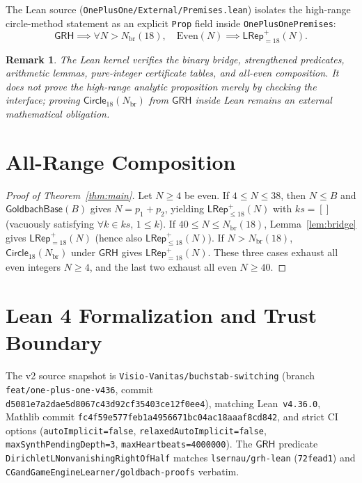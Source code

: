 \documentclass[11pt,a4paper]{article}
\newtheorem{remark}[theorem]{Remark}
\newcommand{\GoldbachBase}{\mathsf{GoldbachBase}}
\newcommand{\Circle}[1]{\mathsf{Circle}_{#1}}
\newcommand{\LRepPos}[1]{\mathsf{LRep}^{+}_{=#1}}
\newcommand{\LRepLe}[1]{\mathsf{LRep}^{+}_{\le #1}}
\newcommand{\GRH}{\mathsf{GRH}}
\begin{document}
The Lean source (\texttt{OnePlusOne/External/Premises.lean}) isolates the high-range circle-method statement as an explicit \texttt{Prop} field inside \texttt{OnePlusOnePremises}:
\[
  \GRH \implies \forall N > N_{\mathrm{br}}(18),\quad \mathrm{Even}(N) \implies \LRepPos{18}(N).
\]

\begin{remark}
The Lean kernel verifies the binary bridge, strengthened predicates, arithmetic lemmas, pure-integer certificate tables, and all-even composition. It does not prove the high-range analytic proposition merely by checking the interface; proving $\Circle{18}(N_{\mathrm{br}})$ from $\GRH$ inside Lean remains an external mathematical obligation.
\end{remark}

\section{All-Range Composition}

\begin{proof}[Proof of Theorem~\ref{thm:main}]
Let $N \ge 4$ be even.
If $4 \le N \le 38$, then $N \le B$ and $\GoldbachBase(B)$ gives $N = p_1 + p_2$, yielding $\LRepLe{18}(N)$ with $ks = []$ (vacuously satisfying $\forall k \in ks,\, 1 \le k$).
If $40 \le N \le N_{\mathrm{br}}(18)$, Lemma~\ref{lem:bridge} gives $\LRepPos{18}(N)$ (hence also $\LRepLe{18}(N)$).
If $N > N_{\mathrm{br}}(18)$, $\Circle{18}(N_{\mathrm{br}})$ under $\GRH$ gives $\LRepPos{18}(N)$.
These three cases exhaust all even integers $N \ge 4$, and the last two exhaust all even $N \ge 40$.
\end{proof}

\section{Lean 4 Formalization and Trust Boundary}

{\sloppy
The v2 source snapshot is \texttt{Visio-Vanitas/buchstab-switching} (branch \texttt{feat/one-plus-one-v436}, commit \texttt{d5081e7a2dae5d8067c43d92cf35403ce12f0ee4}), matching Lean~\texttt{v4.36.0}, Mathlib commit \texttt{fc4f59e577feb1a4956671bc04ac18aaaf8cd842}, and strict CI options (\texttt{autoImplicit=false}, \texttt{relaxedAutoImplicit=false}, \texttt{maxSynthPendingDepth=3}, \texttt{maxHeartbeats=4000000}). The $\GRH$ predicate \texttt{DirichletLNonvanishingRightOfHalf} matches \texttt{lsernau/grh-lean} (\texttt{72fead1}) and \texttt{CGandGameEngineLearner/goldbach-proofs} verbatim.
}
\end{document}
